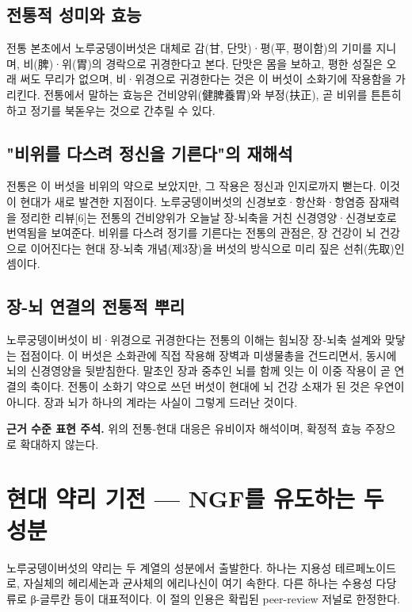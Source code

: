 \documentclass[12pt,oneside]{book}
\newenvironment{authnote}
  {\par\smallskip\begingroup\leftskip=6mm\rightskip=3mm\small\color{muted}\noindent\ignorespaces}
  {\par\endgroup\smallskip}
\begin{document}
\subsection{전통적 성미와 효능}

전통 본초에서 노루궁뎅이버섯은 대체로 감(甘, 단맛)·평(平, 평이함)의 기미를 지니며, 비(脾)·위(胃)의 경락으로 귀경한다고 본다. 단맛은 몸을 보하고, 평한 성질은 오래 써도 무리가 없으며, 비·위경으로 귀경한다는 것은 이 버섯이 소화기에 작용함을 가리킨다. 전통에서 말하는 효능은 건비양위(健脾養胃)와 부정(扶正), 곧 비위를 튼튼히 하고 정기를 북돋우는 것으로 간추릴 수 있다.

\subsection{"비위를 다스려 정신을 기른다"의 재해석}

전통은 이 버섯을 비위의 약으로 보았지만, 그 작용은 정신과 인지로까지 뻗는다. 이것이 현대가 새로 발견한 지점이다. 노루궁뎅이버섯의 신경보호·항산화·항염증 잠재력을 정리한 리뷰[6]는 전통의 건비양위가 오늘날 장-뇌축을 거친 신경영양·신경보호로 번역됨을 보여준다. 비위를 다스려 정기를 기른다는 전통의 관점은, 장 건강이 뇌 건강으로 이어진다는 현대 장-뇌축 개념(제3장)을 버섯의 방식으로 미리 짚은 선취(先取)인 셈이다.

\subsection{장-뇌 연결의 전통적 뿌리}

노루궁뎅이버섯이 비·위경으로 귀경한다는 전통의 이해는 힘뇌장 장-뇌축 설계와 맞닿는 접점이다. 이 버섯은 소화관에 직접 작용해 장벽과 미생물총을 건드리면서, 동시에 뇌의 신경영양을 뒷받침한다. 말초인 장과 중추인 뇌를 함께 잇는 이 이중 작용이 곧 연결의 축이다. 전통이 소화기 약으로 쓰던 버섯이 현대에 뇌 건강 소재가 된 것은 우연이 아니다. 장과 뇌가 하나의 계라는 사실이 그렇게 드러난 것이다.

\begin{authnote}\textbf{근거 수준 표현 주석.} 위의 전통-현대 대응은 유비이자 해석이며, 확정적 효능 주장으로 확대하지 않는다.\end{authnote}

\section{현대 약리 기전 — NGF를 유도하는 두 성분}

노루궁뎅이버섯의 약리는 두 계열의 성분에서 출발한다. 하나는 지용성 테르페노이드로, 자실체의 헤리세논과 균사체의 에리나신이 여기 속한다. 다른 하나는 수용성 다당류로 β-글루칸 등이 대표적이다. 이 절의 인용은 확립된 peer-review 저널로 한정한다.
\end{document}
